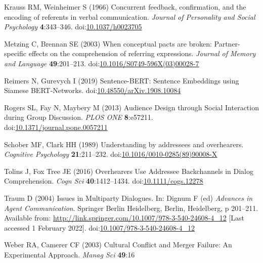 \documentclass[
  english,
  a4paper,
]{article}
\newlength{\cslhangindent}
\newlength{\cslentryspacingunit} %
\newenvironment{CSLReferences}[2] %
 {%
  \setlength{\parindent}{0pt}
  \ifodd #1
  \let\oldpar\par
  \def\par{\hangindent=\cslhangindent\oldpar}
  \fi
  \setlength{\parskip}{#2\cslentryspacingunit}
 }%
 {}
\begin{document}
\begin{CSLReferences}{1}{0}
\leavevmode{}%
Krauss RM, Weinheimer S (1966) Concurrent feedback, confirmation, and the encoding of referents in verbal communication. \emph{Journal of Personality and Social Psychology} \textbf{4}:343--346. doi:\href{https://doi.org/10.1037/h0023705}{10.1037/h0023705}

\leavevmode{}%
Metzing C, Brennan SE (2003) When conceptual pacts are broken: {Partner-specific} effects on the comprehension of referring expressions. \emph{Journal of Memory and Language} \textbf{49}:201--213. doi:\href{https://doi.org/10.1016/S0749-596X(03)00028-7}{10.1016/S0749-596X(03)00028-7}

\leavevmode{}%
Reimers N, Gurevych I (2019) Sentence-{BERT}: {Sentence Embeddings} using {Siamese BERT-Networks}. doi:\href{https://doi.org/10.48550/arXiv.1908.10084}{10.48550/arXiv.1908.10084}

\leavevmode{}%
Rogers SL, Fay N, Maybery M (2013) Audience {Design} through {Social Interaction} during {Group Discussion}. \emph{PLOS ONE} \textbf{8}:e57211. doi:\href{https://doi.org/10.1371/journal.pone.0057211}{10.1371/journal.pone.0057211}

\leavevmode{}%
Schober MF, Clark HH (1989) Understanding by addressees and overhearers. \emph{Cognitive Psychology} \textbf{21}:211--232. doi:\href{https://doi.org/10.1016/0010-0285(89)90008-X}{10.1016/0010-0285(89)90008-X}

\leavevmode{}%
Tolins J, Fox Tree JE (2016) Overhearers {Use Addressee Backchannels} in {Dialog Comprehension}. \emph{Cogn Sci} \textbf{40}:1412--1434. doi:\href{https://doi.org/10.1111/cogs.12278}{10.1111/cogs.12278}

\leavevmode{}%
Traum D (2004) Issues in {Multiparty Dialogues}. In: Dignum F (ed) \emph{Advances in {Agent Communication}}. {Springer Berlin Heidelberg}, {Berlin, Heidelberg}, p 201--211. Available from: \url{http://link.springer.com/10.1007/978-3-540-24608-4_12} {[}Last accessed 1 February 2022{]}. doi:\href{https://doi.org/10.1007/978-3-540-24608-4_12}{10.1007/978-3-540-24608-4\_12}

\leavevmode{}%
Weber RA, Camerer CF (2003) Cultural {Conﬂict} and {Merger Failure}: {An Experimental Approach}. \emph{Manag Sci} \textbf{49}:16


\end{CSLReferences}
\end{document}
